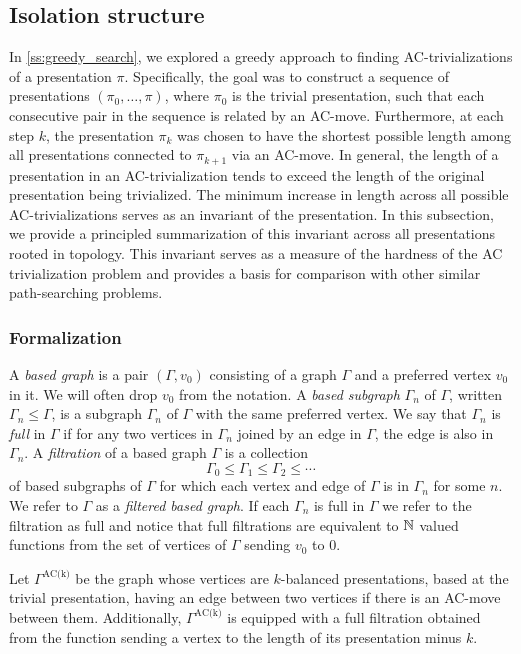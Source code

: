 \subsection{Isolation structure}\label{ss:components}

In \cref{ss:greedy_search}, we explored a greedy approach to finding AC-trivializations of a presentation \(\pi\).
Specifically, the goal was to construct a sequence of presentations \((\pi_0, \dots, \pi)\), where \(\pi_0\) is the trivial presentation, such that each consecutive pair in the sequence is related by an AC-move.
Furthermore, at each step \(k\), the presentation \(\pi_k\) was chosen to have the shortest possible length among all presentations connected to \(\pi_{k+1}\) via an AC-move.
In general, the length of a presentation in an AC-trivialization tends to exceed the length of the original presentation being trivialized.
The minimum increase in length across all possible AC-trivializations serves as an invariant of the presentation.
In this subsection, we provide a principled summarization of this invariant across all presentations rooted in topology.
This invariant serves as a measure of the hardness of the AC trivialization problem and provides a basis for comparison with other similar path-searching problems.

\subsubsection{Formalization}

A \textit{based graph} is a pair $(\Gamma, v_0)$ consisting of a graph $\Gamma$ and a preferred vertex $v_0$ in it.
We will often drop $v_0$ from the notation.
A \textit{based subgraph} $\Gamma_n$ of $\Gamma$, written $\Gamma_n \leq \Gamma$, is a subgraph $\Gamma_n$ of $\Gamma$ with the same preferred vertex.
We say that $\Gamma_n$ is \textit{full} in $\Gamma$ if for any two vertices in $\Gamma_n$ joined by an edge in $\Gamma$, the edge is also in $\Gamma_n$.
A \textit{filtration} of a based graph $\Gamma$ is a collection
\[
\Gamma_0 \leq \Gamma_1 \leq \Gamma_2 \leq \dotsb
\]
of based subgraphs of $\Gamma$ for which each vertex and edge of $\Gamma$ is in $\Gamma_n$ for some $n$.
We refer to $\Gamma$ as a \textit{filtered based graph}.
If each $\Gamma_n$ is full in $\Gamma$ we refer to the filtration as full and notice that full filtrations are equivalent to $\mathbb{N}$ valued functions from the set of vertices of $\Gamma$ sending $v_0$ to $0$.

Let $\Gamma^{\text{AC(k)}}$ be the graph whose vertices are $k$-balanced presentations, based at the trivial presentation, having an edge between two vertices if there is an AC-move between them.
Additionally, $\Gamma^{\text{AC(k)}}$ is equipped with a full filtration obtained from the function sending a vertex to the length of its presentation minus $k$.

